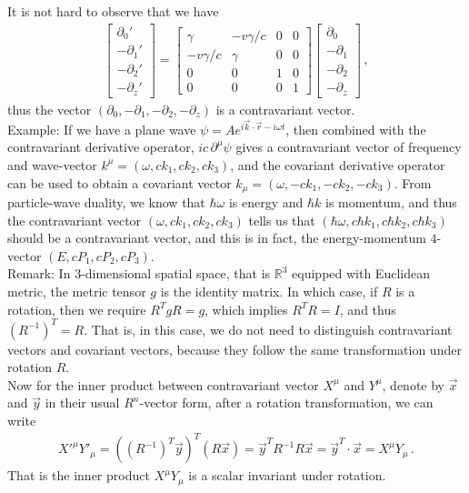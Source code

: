 \documentclass[11pt, onesided]{book}
\theoremstyle{break}
\theoremstyle{break}
\newcommand{\R}{\mathbb{R}}
\newcommand{\pd}{\partial}
\newcommand{\bmat}[1]{\begin{bmatrix} #1 \end{bmatrix}}
\newcommand{\remark}{\color{blue}Remark: \color{black}}
\newcommand{\example}{\color{green}Example: \color{black}}
\begin{document}
It is not hard to observe that we have
\begin{align*}
\bmat{\pd_0'\\
-\pd_1'\\
-\pd_2'\\
-\pd_z'} = 
\bmat{\gamma & -v\gamma/c & 0 & 0\\
-v\gamma/c & \gamma &0 &0\\
0 &0 &1 &0\\
0 & 0&0 & 1}
\bmat{\pd_0\\
-\pd_1\\
-\pd_2\\
-\pd_z}\,,
\end{align*}
thus the vector $(\pd_0, -\pd_1,-\pd_2,-\pd_z)$ is a contravariant vector. \\

\example If we have a plane wave $\psi = Ae^{i\vec{k}\cdot \vec{r}-i\omega t}$, then combined with the contravariant derivative operator, $ic\,\pd^\mu \psi$ gives a contravariant vector of frequency and wave-vector $k^\mu = (\omega, ck_1, ck_2, ck_3)$, and the covariant derivative operator can be used to obtain a covariant vector $k_\mu = (\omega, -ck_1, -ck_2,-ck_3)$. From particle-wave duality, we know that $\hbar \omega$ is energy and $\hbar k$ is momentum, and thus the contravariant vector $(\omega, ck_1, ck_2, ck_3)$ tells us that $(\hbar \omega, c\hbar k_1, c\hbar k_2, c\hbar k_3)$ should be a contravariant vector, and this is in fact, the energy-momentum $4$-vector $(E, cP_1, cP_2, cP_3)$. \\

\remark In $3$-dimensional spatial space, that is $\R^3$ equipped with Euclidean metric, the metric tensor $g$ is the identity matrix. In which case, if $R$ is a rotation, then we require $R^TgR = g$, which implies $R^T R = I$, and thus $(R^{-1})^T = R$. That is, in this case, we do not need to distinguish contravariant vectors and covariant vectors, because they follow the same transformation under rotation $R$. \\



Now for the inner product between contravariant vector $X^\mu$ and $Y^\mu$, denote by $\vec{x}$ and $\vec{y}$ in their usual $R^n$-vector form, after a rotation transformation, we can write
\begin{align*}
X'^\mu Y'_\mu = ((R^{-1})^T \vec{y})^T (R\vec{x}) = \vec{y}^T R^{-1}R \vec{x} = \vec{y}^T\cdot \vec{x} = X^\mu Y_\mu\,.
\end{align*}
That is the inner product $X^\mu Y_\mu$ is a scalar invariant under rotation.\\
\end{document}
